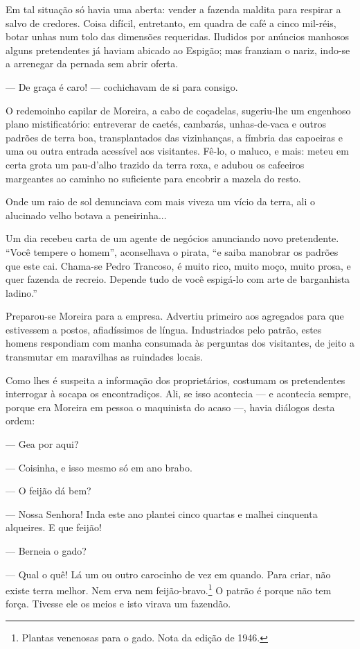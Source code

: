 Em tal situação só havia uma aberta: vender a fazenda maldita para
respirar a salvo de credores. Coisa difícil, entretanto, em quadra de
café a cinco mil-réis, botar unhas num tolo das dimensões requeridas.
Iludidos por anúncios manhosos alguns pretendentes já haviam abicado ao
Espigão; mas franziam o nariz, indo-se a arrenegar da pernada sem abrir
oferta.

--- De graça é caro! --- cochichavam de si para consigo.

O redemoinho capilar de Moreira, a cabo de coçadelas, sugeriu-lhe um
engenhoso plano mistificatório: entreverar de caetés, cambarás,
unhas-de-vaca e outros padrões de terra boa, transplantados das
vizinhanças, a fímbria das capoeiras e uma ou outra entrada acessível
aos visitantes. Fê-lo, o maluco, e mais: meteu em certa grota um
pau-d'alho trazido da terra roxa, e adubou os cafeeiros margeantes ao
caminho no suficiente para encobrir a mazela do resto.

Onde um raio de sol denunciava com mais viveza um vício da terra, ali o
alucinado velho botava a peneirinha...

Um dia recebeu carta de um agente de negócios anunciando novo
pretendente. ``Você tempere o homem'', aconselhava o pirata, ``e saiba
manobrar os padrões que este cai. Chama-se Pedro Trancoso, é muito rico,
muito moço, muito prosa, e quer fazenda de recreio. Depende tudo de você
espigá-lo com arte de barganhista ladino.''

Preparou-se Moreira para a empresa. Advertiu primeiro aos agregados para
que estivessem a postos, afiadíssimos de língua. Industriados pelo
patrão, estes homens respondiam com manha consumada às perguntas dos
visitantes, de jeito a transmutar em maravilhas as ruindades locais.

Como lhes é suspeita a informação dos proprietários, costumam os
pretendentes interrogar à socapa os encontradiços. Ali, se isso
acontecia --- e acontecia sempre, porque era Moreira em pessoa o
maquinista do acaso ---, havia diálogos desta ordem:

--- Gea por aqui?

--- Coisinha, e isso mesmo só em ano brabo.

--- O feijão dá bem?

--- Nossa Senhora! Inda este ano plantei cinco quartas e malhei
cinquenta alqueires. E que feijão!

--- Berneia o gado?

--- Qual o quê! Lá um ou outro carocinho de vez em quando. Para criar,
não existe terra melhor. Nem erva nem feijão-bravo.\footnote{Plantas
  venenosas para o gado. Nota da edição de 1946.} O patrão é porque não
tem força. Tivesse ele os meios e isto virava um fazendão.

